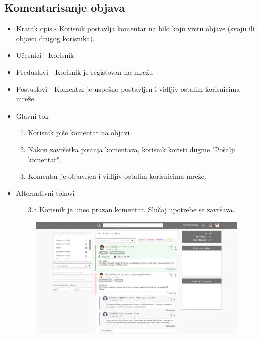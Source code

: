 \subsection{Komentarisanje objava}
\begin{itemize}
	\item Kratak opis - Korisnik postavlja komentar na bilo koju vrstu objave (svoju ili objavu drugog korisnika). 
	\item Učesnici - Korisnik
	\item Preduslovi - Korisnik je registovan na mrežu
	\item Postuslovi - Komentar je uspešno postavljen i vidljiv ostalim korisnicima mreže.
	\item Glavni tok
	\begin{enumerate}
		\item Korisnik piše komentar na objavi.
		\item Nakon završetka pisanja komentara, korisnik koristi dugme "Pošalji komentar". 
		\item Komentar je objavljen i vidljiv ostalim korisnicima mreže.
	\end{enumerate}
	\item Alternativni tokovi
    \begin{itemize}
		\item[3.a] Korisnik je uneo prazan komentar. Slučaj upotrebe se završava.
	\end{itemize}
\begin{figure}[h!]
		\centerline{\includegraphics[width=\textwidth]{slike/komentarisanje_objava.png}}
\end{figure}
\end{itemize}

